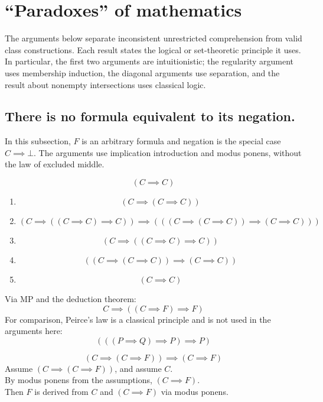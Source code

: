 \def\topic{}


\section{``Paradoxes'' of mathematics}
The arguments below separate inconsistent unrestricted comprehension from
valid class constructions. Each result states the logical or set-theoretic
principle it uses. In particular, the first two arguments are intuitionistic;
the regularity argument uses membership induction, the diagonal arguments
use separation, and the result about nonempty intersections uses classical
logic.

\subsection{There is no formula equivalent to its negation.}
In this subsection, $F$ is an arbitrary formula and negation is the special
case $C\implies\bot$. The arguments use implication introduction and
modus ponens, without the law of excluded middle.
\begin{lemma}
\label{lem:CtoC}
\[
(C\implies C)
\]
\Proof
\begin{enumerate}
\item \[(C\implies (C\implies C)) \tag{by ax.1}\]
\item \[(C\implies ((C\implies C)\implies C))\implies
(((C\implies (C\implies C))\implies (C\implies C)) )
\tag{by ax.2}\]
\item \[(C\implies ((C\implies C)\implies C)) \tag{by ax.1}\]
\item \[((C\implies (C\implies C))\implies (C\implies C)) \tag{by MP from steps 2 and 3}\]
\item \[(C\implies C)\tag{by MP from steps 1 and 4}\]
\end{enumerate}
\Done
\end{lemma}
\begin{note}
Via MP and the deduction theorem:
\[
C \implies ((C\implies F)\implies F)
\]
For comparison, Peirce's law is a classical principle and is not used in
the arguments here:
\[
(((P \implies Q) \implies P)\implies P)
\]
\end{note}

\begin{lemma}
\label{lem:CtoF}
\[
(C\implies (C\implies F))\implies (C\implies F)
\]
\Proof
Assume $(C\implies (C\implies F))$, and assume $C$.\\
By modus ponens from the assumptions, $(C\implies F)$.\\
Then $F$ is derived from $C$ and $(C\implies F)$ via modus ponens.
\Done
\end{lemma}

